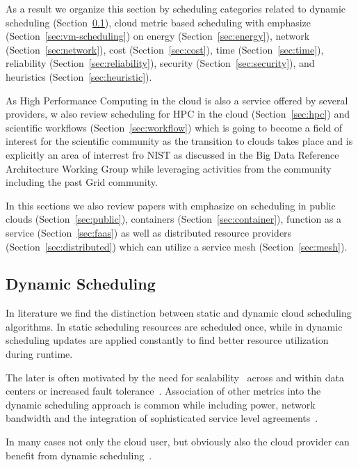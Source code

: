 \documentclass[final,5p,times,twocolumn]{elsarticle}
\begin{document}
As a result we organize this section by scheduling categories related to 
%
dynamic scheduling (Section~\ref{sec:dynamic}),
cloud metric based scheduling with emphasize (Section~\ref{sec:vm-scheduling}) on 
energy (Section~\ref{sec:energy}),
network (Section~\ref{sec:network}),
cost (Section~\ref{sec:cost}),
time (Section~\ref{sec:time}),
reliability (Section~\ref{sec:reliability}),
security (Section~\ref{sec:security}), 
and heuristics (Section~\ref{sec:heuristic}).

As High Performance Computing in the cloud is also a service offered
by several providers, w also review scheduling for HPC in the cloud
(Section~\ref{sec:hpc}) and scientific workflows
(Section~\ref{sec:workflow}) which is going to become a field of
interest for the scientific community as the transition to clouds
takes place and is explicitly an area of interrest fro NIST as
discussed in the Big Data Reference Architecture Working Group while
leveraging activities from the community including the past Grid
community.

In this sections we also review papers with emphasize on scheduling in
public clouds (Section~\ref{sec:public}), 
containers (Section~\ref{sec:container}), function as a service
(Section~\ref{sec:faas}) as well as distributed resource providers
(Section~\ref{sec:distributed}) which can utilize a service mesh
(Section~\ref{sec:mesh}).





\subsection{Dynamic Scheduling}\label{sec:dynamic}

In literature we find the distinction between static and dynamic cloud
scheduling algorithms.  In static scheduling resources are scheduled
once, while in dynamic scheduling updates are applied constantly to
find better resource utilization during runtime.


The later is often motivated by the need for
scalability~\cite{keller2014hierarchical} across and within data
centers or increased fault
tolerance~\cite{tighe2013distributed}. Association of other metrics
into the dynamic scheduling approach is common while including power,
network bandwidth and the integration of sophisticated service level
agreements~\cite{tighe2013distributed}.

In many cases not only the cloud user, but obviously also the cloud
provider can benefit from dynamic
scheduling~\cite{tighe2014integrating}.
\end{document}
